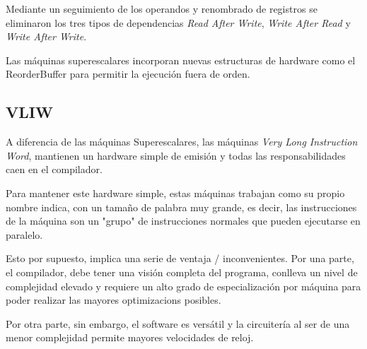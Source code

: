 \bigskip
Mediante un seguimiento de los operandos y renombrado de registros se eliminaron los tres tipos 
de dependencias \textit{Read After Write}, \textit{Write After Read} y \textit{Write After Write}. 

\bigskip
Las máquinas superescalares incorporan nuevas estructuras de hardware como el ReorderBuffer para
permitir la ejecución fuera de orden.

\subsection{VLIW}

A diferencia de las máquinas Superescalares, las máquinas \textit{Very Long Instruction Word},
mantienen un hardware simple de emisión y todas las responsabilidades caen en el compilador.

\bigskip
Para mantener este hardware simple, estas máquinas trabajan como su propio nombre indica, con
un tamaño de palabra muy grande, es decir, las instrucciones de la máquina son un "grupo"
de instrucciones normales que pueden ejecutarse en paralelo.

\bigskip
Esto por supuesto, implica una serie de ventaja / inconvenientes. Por una parte, el compilador,
debe tener una visión completa del programa, conlleva un nivel de complejidad elevado y requiere
un alto grado de especialización por máquina para poder realizar las mayores optimizacions posibles.

\bigskip
Por otra parte, sin embargo, el software es versátil y la circuitería al ser de una menor complejidad 
permite mayores velocidades de reloj.